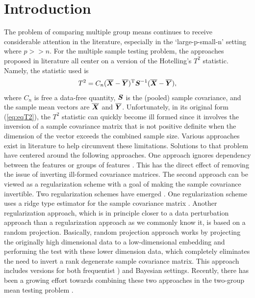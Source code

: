 \documentclass[times,sort&compress,3p]{elsarticle}
\theoremstyle{plain}%
\theoremstyle{definition}
\def\be{\begin{eqnarray}}
\def\ee{\end{eqnarray}}
\def\trans{^{\rm T}}
\newcommand{\uS}       {\mbox{\boldmath$S$}}
\newcommand{\uX}       {\mbox{\boldmath$X$}}
\newcommand{\uY}       {\mbox{\boldmath$Y$}}
\begin{document}
\section{Introduction} \label{sec:intro}
The problem of comparing multiple group means continues to receive considerable attention in the literature, especially in the ‘large-p-small-n’ setting where $p >> n$. For the multiple sample testing problem, the approaches proposed in literature all center on a version of the Hotelling's $T^2$ statistic. Namely, the statistic used is
\be
T^{2} = C_{n}(\overline{\uX} - \overline{\uY})\trans\uS^{-1} (\overline{\uX} - \overline{\uY}), \label{eq:eqT2}
\ee
where $C_{n}$ is free a data-free quantity, $\uS$ is the (pooled) sample covariance, and the sample mean vectors are $\overline{\uX}$ and $\overline{\uY}$.
Unfortunately, in its original form (\ref{eq:eqT2}), the $T^2$ statistic can quickly become ill formed since it involves the inversion of a sample covariance matrix that is not positive definite when the dimension of the vector exceeds the combined sample size. Various approaches exist in literature to help circumvent these limitations. Solutions to that problem have centered around the following approaches. One approach ignores dependency between the features or groups of features \cite{ahmad2014u,bai1996effect,chen2010two,feng2017composite}. This has the direct effect of removing the issue of inverting ill-formed covariance matrices. The second approach can be viewed as a regularization scheme with a goal of making the sample covariance invertible. Two regularization schemes have emerged \cite{hu2020pairwise}. One regularization scheme uses a ridge type estimator for the sample covariance matrix \cite{chen2011regularized,li2020adaptable}. Another regularization approach, which is in principle closer to a data perturbation approach than a regularization approach as we commonly know it, is based on a random projection. Basically, random projection approach works by projecting the originally high dimensional data to a low-dimensional embedding and performing the test with these lower dimension data, which completely eliminates the need to invert a rank degenerate sample covariance matrix. This approach includes versions for both frequentist \cite{lopes2011more,srivastava2014raptt,thulin2014high}) and Bayesian \cite{zoh2018powerful} settings. Recently, there has been a growing effort towards combining these two approaches in the two-group mean testing problem \cite{hu2020pairwise}.
\end{document}
